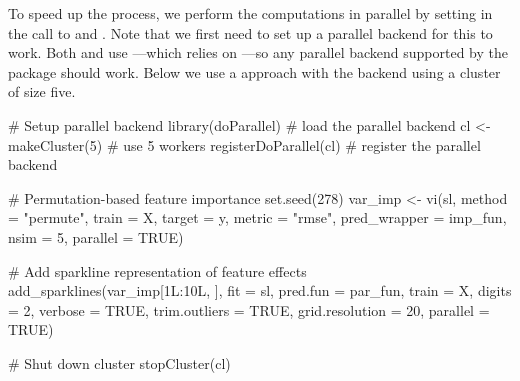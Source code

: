 
To speed up the process, we perform the computations in parallel by setting  in the call to  and . Note that we first need to set up a parallel backend for this to work. Both  and  use  \citep{plyr-pkg}---which relies on  \citep{foreach-pkg}---so any parallel backend supported by the  package should work. Below we use a  approach with the  backend \citep{doParallel-pkg} using a cluster of size five.

\begin{example}
# Setup parallel backend
library(doParallel) # load the parallel backend
cl <- makeCluster(5) # use 5 workers
registerDoParallel(cl) # register the parallel backend

# Permutation-based feature importance
set.seed(278)
var_imp <- vi(sl, method = "permute", train = X, target = y, metric = "rmse",
              pred_wrapper = imp_fun, nsim = 5, parallel = TRUE)

# Add sparkline representation of feature effects
add_sparklines(var_imp[1L:10L, ], fit = sl, pred.fun = par_fun, train = X, 
               digits = 2, verbose = TRUE, trim.outliers = TRUE, 
               grid.resolution = 20, parallel = TRUE)
               
# Shut down cluster
stopCluster(cl)
\end{example}

